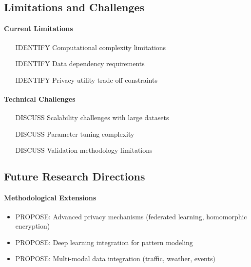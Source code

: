 \documentclass[runningheads]{llncs}
\begin{document}
\subsection{Limitations and Challenges}

\paragraph{Current Limitations}
\begin{itemize}
\item [IDENTIFY] Computational complexity limitations
\item [IDENTIFY] Data dependency requirements
\item [IDENTIFY] Privacy-utility trade-off constraints
\end{itemize}

\paragraph{Technical Challenges}
\begin{itemize}
\item [DISCUSS] Scalability challenges with large datasets
\item [DISCUSS] Parameter tuning complexity
\item [DISCUSS] Validation methodology limitations
\end{itemize}

\subsection{Future Research Directions}

\paragraph{Methodological Extensions}
\begin{itemize}
\item PROPOSE: Advanced privacy mechanisms (federated learning, homomorphic encryption)
\item PROPOSE: Deep learning integration for pattern modeling
\item PROPOSE: Multi-modal data integration (traffic, weather, events)
\end{itemize}
\end{document}
